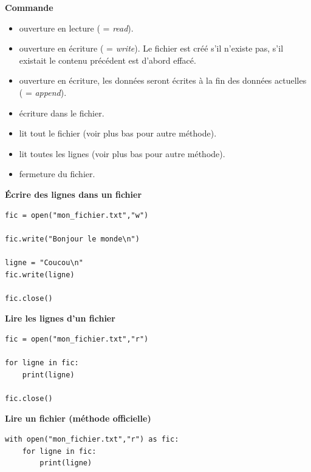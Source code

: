 \documentclass[11pt,class=report,crop=false]{standalone}
\begin{document}
\textbf{Commande} 

\begin{itemize}
  \item {} \quad ouverture en lecture ( = \emph{read}).
  \item {} \quad ouverture en écriture ( = \emph{write}). Le fichier est créé s'il n'existe pas, s'il existait le contenu précédent est d'abord effacé.
  \item {} \quad ouverture en écriture, les données seront écrites à la fin des données actuelles ( = \emph{append}).
  
  \item {} \quad écriture dans le fichier.
  \item {} \quad lit tout le fichier (voir plus bas pour autre méthode).
  \item {} \quad lit toutes les lignes (voir plus bas pour autre méthode).
  
  \item {} \quad fermeture du fichier.
\end{itemize}

\bigskip

\textbf{\'Ecrire des lignes dans un fichier} 

\begin{lstlisting}
fic = open("mon_fichier.txt","w")

fic.write("Bonjour le monde\n")

ligne = "Coucou\n"
fic.write(ligne)

fic.close()
\end{lstlisting}



\bigskip

\textbf{Lire les lignes d'un fichier} 

\begin{lstlisting}
fic = open("mon_fichier.txt","r")

for ligne in fic:
    print(ligne)

fic.close()
\end{lstlisting}


\bigskip

\textbf{Lire un fichier (méthode officielle)} 

\begin{lstlisting}
with open("mon_fichier.txt","r") as fic: 
    for ligne in fic: 
        print(ligne) 
\end{lstlisting}
\end{document}

